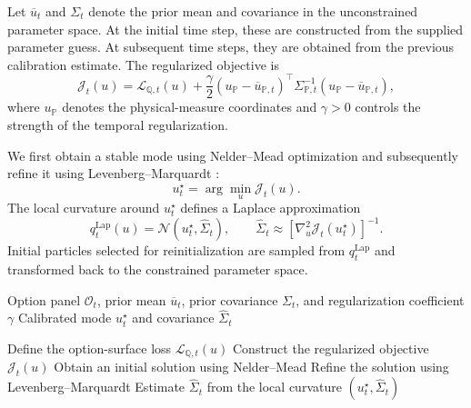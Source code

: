 \documentclass[sigconf,anonymous,review]{acmart}
\begin{document}
Let \(\overline{u}_t\) and \(\Sigma_t\) denote the prior mean and covariance in the unconstrained parameter space. At the initial time step, these are constructed from the supplied parameter guess. At subsequent time steps, they are obtained from the previous calibration estimate. The regularized objective is
%
\begin{equation}
\mathcal{J}_t(u)
=
\mathcal{L}_{\mathbb{Q},t}(u)
+
\frac{\gamma}{2}
\left(
u_{\mathbb{P}}
-
\overline{u}_{\mathbb{P},t}
\right)^{\top}
\Sigma_{\mathbb{P},t}^{-1}
\left(
u_{\mathbb{P}}
-
\overline{u}_{\mathbb{P},t}
\right),
\label{eq:laplace_objective}
\end{equation}
%
where \(u_{\mathbb{P}}\) denotes the physical-measure coordinates and \(\gamma>0\) controls the strength of the temporal regularization.

We first obtain a stable mode using Nelder--Mead optimization and subsequently refine it using Levenberg--Marquardt \cite{nelder1965,levenberg1944,marquardt1963}:
%
\begin{equation}
u_t^{\star}
=
\arg\min_{u}
\mathcal{J}_t(u).
\end{equation}
%
The local curvature around \(u_t^{\star}\) defines a Laplace approximation \cite{tierney1986laplace}
%
\begin{equation}
q_t^{\mathrm{Lap}}(u)
=
\mathcal{N}
\left(
u_t^{\star},
\widehat{\Sigma}_t
\right),
\qquad
\widehat{\Sigma}_t
\approx
\left[
\nabla_u^2
\mathcal{J}_t
\left(
u_t^{\star}
\right)
\right]^{-1}.
\label{eq:laplace_distribution}
\end{equation}
Initial particles selected for reinitialization are sampled from \(q_t^{\mathrm{Lap}}\) and transformed back to the constrained parameter space.

\begin{algorithm}[t]
\caption{Laplace-Regularized Surface Calibration}
\label{alg:laplace_surface_calibration}
\begin{algorithmic}[1]
\Require Option panel \(\mathcal{O}_t\), prior mean \(\overline{u}_t\), prior covariance \(\Sigma_t\), and regularization coefficient \(\gamma\)
\Ensure Calibrated mode \(u_t^{\star}\) and covariance \(\widehat{\Sigma}_t\)

\State Define the option-surface loss \(\mathcal{L}_{\mathbb{Q},t}(u)\)
\State Construct the regularized objective \(\mathcal{J}_t(u)\)
\State Obtain an initial solution using Nelder--Mead
\State Refine the solution using Levenberg--Marquardt
\State Estimate \(\widehat{\Sigma}_t\) from the local curvature
\State \Return \(\left(u_t^{\star},\widehat{\Sigma}_t\right)\)
\end{algorithmic}
\end{algorithm}
\end{document}
